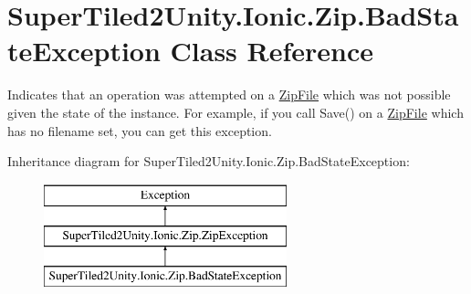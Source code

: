 \hypertarget{class_super_tiled2_unity_1_1_ionic_1_1_zip_1_1_bad_state_exception}{}\section{Super\+Tiled2\+Unity.\+Ionic.\+Zip.\+Bad\+State\+Exception Class Reference}
\label{class_super_tiled2_unity_1_1_ionic_1_1_zip_1_1_bad_state_exception}


Indicates that an operation was attempted on a \mbox{\hyperlink{class_super_tiled2_unity_1_1_ionic_1_1_zip_1_1_zip_file}{Zip\+File}} which was not possible given the state of the instance. For example, if you call {\ttfamily Save()} on a \mbox{\hyperlink{class_super_tiled2_unity_1_1_ionic_1_1_zip_1_1_zip_file}{Zip\+File}} which has no filename set, you can get this exception.  


Inheritance diagram for Super\+Tiled2\+Unity.\+Ionic.\+Zip.\+Bad\+State\+Exception\+:\begin{figure}[H]
\begin{center}
\leavevmode
\includegraphics[height=3.000000cm]{class_super_tiled2_unity_1_1_ionic_1_1_zip_1_1_bad_state_exception}
\end{center}
\end{figure}
